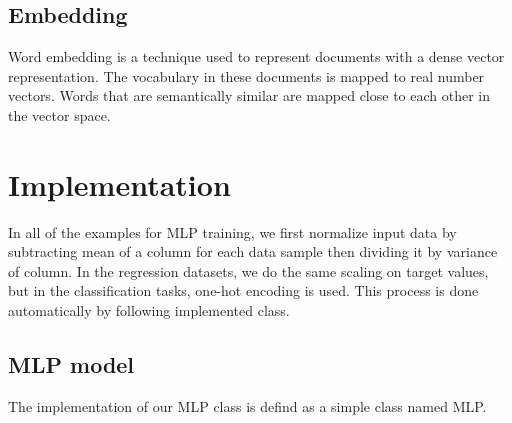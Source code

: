 \documentclass[10pt]{SelfArx} %
\begin{document}
\subsection{Embedding}
Word embedding is a technique used to represent documents with a dense vector representation. The vocabulary in these documents is mapped to real number vectors. Words that are semantically similar are mapped close to each other in the vector space. 


\section{Implementation}

In all of the examples for MLP training, we first normalize input data by subtracting mean of a column for each data sample then dividing it by variance of column. In the regression datasets, we do the same scaling on target values, but in the classification tasks, one-hot encoding is used.
This process is done automatically by following implemented class.

\subsection{MLP model}

The implementation of our MLP class is defind as a simple class named MLP.
\end{document}
